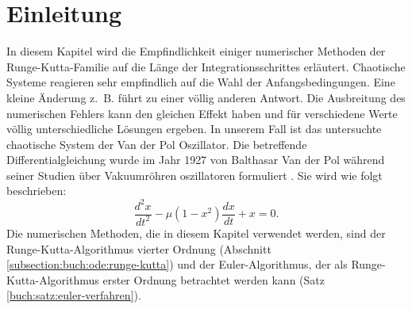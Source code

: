 %
%
%
\section{Einleitung\label{vanderpol:section:einleitung}}
In diesem Kapitel wird die Empfindlichkeit einiger numerischer Methoden der Runge-Kutta-Familie auf die Länge der Integrationsschrittes erläutert.
%
%
Chaotische Systeme reagieren sehr empfindlich auf die Wahl der Anfangsbedingungen. Eine kleine Änderung z.~B. führt zu einer völlig anderen Antwort.
Die Ausbreitung des numerischen Fehlers kann den gleichen Effekt haben und für verschiedene Werte völlig unterschiedliche Lösungen ergeben.
In unserem Fall ist das untersuchte chaotische System der Van der Pol Oszillator.
%
%
Die betreffende Differentialgleichung wurde im Jahr 1927 von Balthasar Van der Pol während seiner Studien über Vakuumröhren oszillatoren formuliert \cite{vanderpol:bibvdp}.
%
%
Sie wird wie folgt beschrieben:
\begin{equation}
\frac{d^{2}x}{dt^{2}} - \mu (1 - x^{2}) \frac{dx}{dt} + x = 0.
\label{vanderpol:equations:vdp}
\end{equation}
Die numerischen Methoden, die in diesem Kapitel verwendet werden, sind der Runge-Kutta-Algo\-rith\-mus vierter Ordnung (Abschnitt \ref{subsection:buch:ode:runge-kutta}) und der Euler-Algorithmus, der als Runge-Kutta-Algorithmus erster Ordnung betrachtet werden kann (Satz \ref{buch:satz:euler-verfahren}).
%
